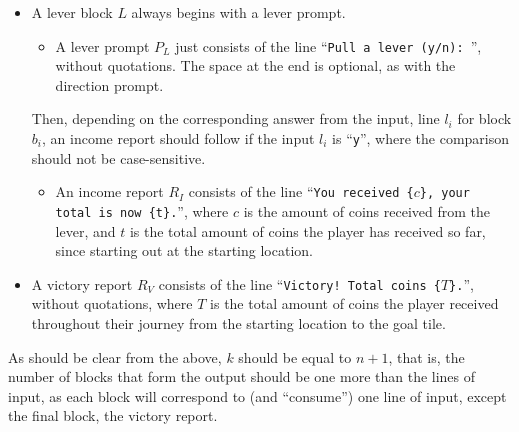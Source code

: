 \begin{itemize}
    \item
    A lever block $L$ always begins with a lever prompt.
    \begin{itemize}
        \item
        A lever prompt $P_L$ just consists of the line
        ``\texttt{Pull a lever (y/n): }'', without quotations.
        The space at the end is optional,
        as with the direction prompt.
    \end{itemize}
    Then, depending on the corresponding answer from the input,
    line $l_i$ for block $b_i$,
    an income report should follow if the input $l_i$ is ``\texttt{y}'',
    where the comparison should not be case-sensitive.
    \begin{itemize}
        \item
        An income report $R_I$ consists of the line
        ``\texttt{You received \{$c$\}, your total is now \{t\}.}'',
        where $c$ is the amount of coins received from the lever,
        and $t$ is the total amount of coins the player has received so far,
        since starting out at the starting location.
    \end{itemize}

    \item
    A victory report $R_V$ consists of the line
    ``\texttt{Victory! Total coins \{$T$\}.}'', without quotations,
    where $T$ is the total amount of coins the player received
    throughout their journey from the starting location to the goal tile.
\end{itemize}

As should be clear from the above,
$k$ should be equal to $n+1$,
that is, the number of blocks that form the output
should be one more than the lines of input,
as each block will correspond to (and ``consume'') one line of input,
except the final block, the victory report.
